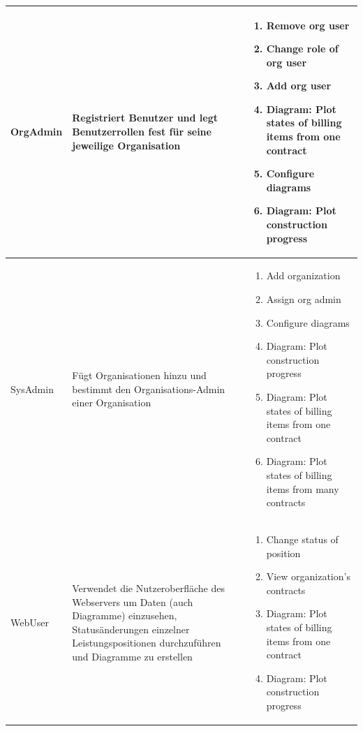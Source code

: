 \begin{longtable}[c]{|p{2cm}|p{6cm}|p{6cm}|}
    OrgAdmin        & Registriert Benutzer und legt Benutzerrollen fest für seine jeweilige Organisation                                                                                                      &
    \begin{enumerate}
        \item Remove org user 
        \item Change role of org user 
        \item Add org user 
        \item Diagram: Plot states of billing items from one contract 
        \item Configure diagrams 
        \item Diagram: Plot construction progress
    \end{enumerate}                                                                                                                                                                                                                        \\ \hline
    SysAdmin        & F\"ugt Organisationen hinzu und bestimmt den Organisations-Admin einer Organisation                                                                                                     &
    \begin{enumerate}
        \item Add organization 
        \item Assign org admin 
        \item Configure diagrams 
        \item Diagram: Plot construction progress 
        \item Diagram: Plot states of billing items from one contract 
        \item Diagram: Plot states of billing items from many contracts
    \end{enumerate}                                                                                                                                                                                                                        \\ \hline
    WebUser            & Verwendet die Nutzeroberfl\"ache des Webservers um Daten (auch Diagramme) einzusehen,  Status\"anderungen einzelner Leistungspositionen durchzuf\"uhren und Diagramme zu erstellen      &
    \begin{enumerate}
        \item Change status of position 
        \item View organization's contracts 
        \item Diagram: Plot states of billing items from one contract 
        \item Diagram: Plot construction progress
    \end{enumerate}                                                                                                                                                                                                                        \\\hline
\end{longtable}

